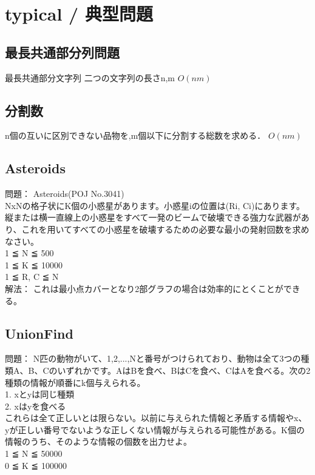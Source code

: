 \section{typical / 典型問題}

\subsection{最長共通部分列問題}
最長共通部分文字列
二つの文字列の長さn,m
$O(nm)$


\subsection{分割数}
n個の互いに区別できない品物を,m個以下に分割する総数を求める．
$O(nm)$



\subsection{Asteroids}
問題：
Asteroids(POJ No.3041)\\
NxNの格子状にK個の小惑星があります。小惑星iの位置は(Ri, Ci)にあります。縦または横一直線上の小惑星をすべて一発のビームで破壊できる強力な武器があり、これを用いてすべての小惑星を破壊するための必要な最小の発射回数を求めなさい。\\
1 ≦ N ≦ 500\\
1 ≦ K ≦ 10000\\
1 ≦ R, C ≦ N\\

解法：
これは最小点カバーとなり2部グラフの場合は効率的にとくことができる。


\subsection{UnionFind}
問題：
N匹の動物がいて、1,2,...,Nと番号がつけられており、動物は全て3つの種類A、B、Cのいずれかです。AはBを食べ、BはCを食べ、CはAを食べる。次の2種類の情報が順番にk個与えられる。\\
1. xとyは同じ種類\\
2. xはyを食べる\\
これらは全て正しいとは限らない。以前に与えられた情報と矛盾する情報やx、yが正しい番号でないような正しくない情報が与えられる可能性がある。K個の情報のうち、そのような情報の個数を出力せよ。\\
1 ≦ N ≦ 50000\\
0 ≦ K ≦ 100000\\

